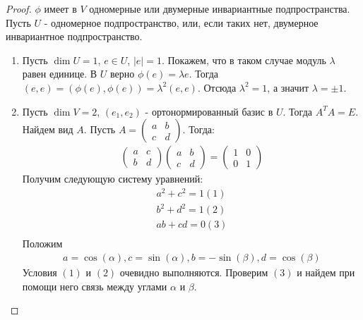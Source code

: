 \begin{proof}
    $\phi$ имеет в $V$ одномерные или двумерные инвариантные подпространства. Пусть $U$ - 
    одномерное подпространство, или, если таких нет, двумерное инвариантное подпространство.
    \begin{enumerate}
        \item Пусть $\dim U = 1$, $e \in U$, $|e|= 1$. Покажем, что в таком случае модуль $\lambda$ равен единице. В $U$ верно $\phi(e) = \lambda e$. Тогда $(e, e) = (\phi(e), \phi(e)) = 
        \lambda^2 (e, e)$. Отсюда $\lambda^2 = 1$, а значит $\lambda = \pm 1$.
        \item Пусть $\dim V = 2$, $(e_1, e_2)$ - ортонормированный базис в $U$. Тогда $A^T A = E$. Найдем вид $A$.
        Пусть $ A = \begin{pmatrix}
                        a     & b \\
                        c     & d        
                    \end{pmatrix}$. Тогда:
        \begin{gather*}
            \begin{pmatrix}
                a     & c \\
                b     & d        
            \end{pmatrix} \begin{pmatrix}
                a     & b \\
                c     & d        
            \end{pmatrix} = \begin{pmatrix}
                1     & 0 \\
                0     & 1        
            \end{pmatrix}
        \end{gather*}
        Получим следующую систему уравнений:
        \begin{gather*}
            a^2 + c^2 = 1 (1) \\
            b^2 + d^2 = 1 (2) \\
            ab + cd = 0 (3) \\
        \end{gather*}
        Положим 
        \begin{gather*}
            a = \cos(\alpha), c = \sin(\alpha), b = - \sin(\beta), d = \cos(\beta)
        \end{gather*}
        Условия $(1)$ и $(2)$ очевидно выполняются. Проверим $(3)$ и найдем при помощи него связь 
        между углами $\alpha$ и $\beta$.

\end{enumerate}
\end{proof}
